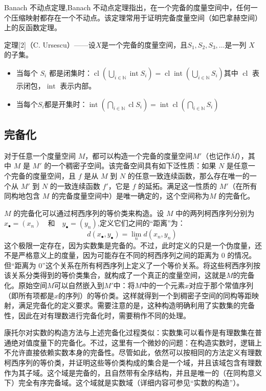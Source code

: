 Banach 不动点定理,Banach 不动点定理指出，在一个完备的度量空间中，任何一个压缩映射都存在一个不动点。该定理常用于证明完备度量空间（如巴拿赫空间）上的反函数定理。

定理[2]（C. Ursescu）——设$X$是一个完备的度量空间，且$S_1, S_2, S_3, \ldots$是一列 $X$ 的子集。
\begin{itemize}
\item 当每个 $S_i$ 都是闭集时：$\operatorname{cl} \left(\bigcup_{i\in\mathbb{N}} \operatorname{int} S_i\right) = \operatorname{cl}\operatorname{int} \left(\bigcup_{i\in\mathbb{N}} S_i\right)$其中 $\operatorname{cl}$ 表示闭包，$\operatorname{int}$ 表示内部。
\item 当每个$S_i$都是开集时：$\operatorname{int} \left(\bigcap_{i\in\mathbb{N}} \operatorname{cl} S_i\right)=\operatorname{int} \operatorname{cl} \left(\bigcap_{i\in\mathbb{N}} S_i\right)$
\end{itemize}
\subsection{完备化}
对于任意一个度量空间 $M$，都可以构造一个完备的度量空间$M'$（也记作$\overline{M}$），其中 $M$ 是 $M'$ 的一个稠密子空间。该完备空间具有如下泛性质：如果 $N$ 是任意一个完备的度量空间，且 $f$ 是从 $M$ 到 $N$ 的任意一致连续函数，那么存在唯一的一个从 $M'$ 到 $N$ 的一致连续函数 $f'$，它是 $f$ 的延拓。满足这一性质的 $M'$（在所有同构地包含 $M$ 的完备度量空间中）是唯一确定的，这个空间称为$M$ 的完备化。

$M$ 的完备化可以通过柯西序列的等价类来构造。设 $M$ 中的两列柯西序列分别为$x_{\bullet} = (x_n) \quad \text{和} \quad y_{\bullet} = (y_n)$,定义它们之间的“距离”为：
$$
d(x_{\bullet}, y_{\bullet}) = \lim_{n} d(x_n, y_n)~
$$
这个极限一定存在，因为实数集是完备的。不过，此时定义的只是一个伪度量，还不是严格意义上的度量，因为可能存在不同的柯西序列之间的距离为 0 的情况。但“距离为 0”这个关系在所有柯西序列上定义了一个等价关系。将这些柯西序列按该关系分类得到的等价类集合，就构成了一个真正的度量空间，这就是$M$的完备化。原始空间$M$可以自然嵌入到$M'$中：将$M$中的一个元素$x$对应于那个常值序列（即所有项都是$x$的序列）的等价类。这样就得到一个到稠密子空间的同构等距映射，满足完备化的定义要求。需要注意的是，这种构造明确利用了实数集的完备性，因此在对有理数进行完备化时，需要稍作不同的处理。

康托尔对实数的构造方法与上述完备化过程类似：实数集可以看作是有理数集在普通绝对值度量下的完备化。不过，这里有一个微妙的问题：在构造实数时，逻辑上不允许直接依赖实数本身的完备性。尽管如此，依然可以按相同的方法定义有理数柯西序列的等价类，并证明这些等价类构成的集合是一个域，并且该域包含有理数作为其子域。这个域是完备的，且自然带有全序结构，并且是唯一的（在同构意义下）完全有序完备域。这个域就是实数域（详细内容可参见“实数的构造”）。

